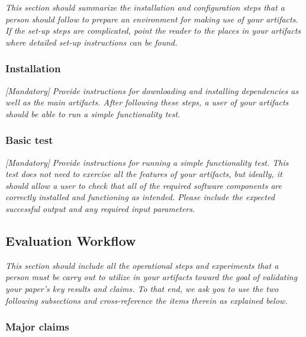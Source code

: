 \documentclass[sigconf]{acmart}
\begin{document}
	\emph{This section should summarize the installation and configuration
		steps that a person should follow to prepare an environment for making
		use of your artifacts.  If the set-up steps are complicated, point the
		reader to the places in your artifacts where detailed set-up
		instructions can be found.}
	
	
	\subsubsection{Installation}
	
	\emph{[Mandatory]}
	\emph{Provide instructions for downloading and installing dependencies
		as well as the main artifacts.  After following these steps, a user of
		your artifacts should be able to run a simple functionality test.}
	
	
	\subsubsection{Basic test}
	
	\emph{[Mandatory]}
	\emph{Provide instructions for running a simple functionality test.
		This test does not need to exercise all the features of your
		artifacts, but ideally, it should allow a user to check that all of
		the required software components are correctly installed and
		functioning as intended.  Please include the expected successful
		output and any required input parameters.}
	
	
	\subsection{Evaluation Workflow}
	
	\emph{This section should include all the operational steps and
		experiments that a person must be carry out to utilize in your
		artifacts toward the goal of validating your paper's key results and
		claims.  To that end, we ask you to use the two following subsections
		and cross-reference the items therein as explained below.}
	
	
	\subsubsection{Major claims}
	
\end{document}
